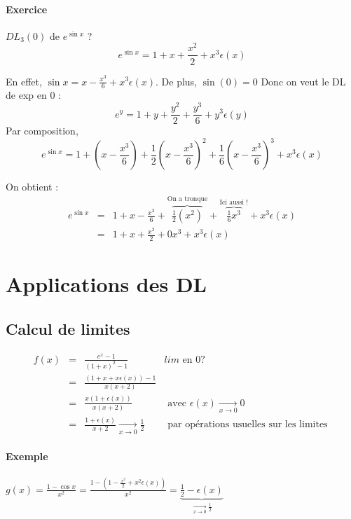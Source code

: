 \paragraph{Exercice} $DL_3(0)$ de $e^{\sin x}$ ? \[e^{\sin x} = 1 + x + \frac{x^2}{2}+x^3\epsilon (x)\]

En effet, $\sin x = x - \frac{x^3}{6}+x^3 \epsilon (x)$. De plus, $\sin(0) = 0$ Donc on veut le DL de exp en 0 : \[
e^y = 1 + y + \frac{y^2}{2}+\frac{y^3}{6} + y^3 \epsilon (y)\]
Par composition, \[e^{\sin x} = 1 + (x-\frac{x^3}{6}) + \frac{1}{2}(x - \frac{x^3}{6})^2 + \frac{1}{6} (x - \frac{x^3}{6})^3 + x^3 \epsilon (x) \]

On obtient : \[\begin{array}{rcl}
e^{\sin x} &=& 1 + x - \frac{x^3}{6} + \overbrace{\frac{1}{2}(x^2)}^{\text{On a tronque}} + \overbrace{\frac{1}{6}x^3}^{\text{Ici aussi !}} + x^3\epsilon (x) \\
&=& 1 +x + \frac{x^2}{2} + 0x^3 + x^3 \epsilon (x)
\end{array}\]

\section{Applications des DL}
\subsection{Calcul de limites}
\[\begin{array}{rclr}
f(x) &=& \frac{e^x-1}{(1+x)^2 - 1} & lim \text{ en } 0 ? \\
&=& \frac{(1+x+x\epsilon(x)) -1}{x(x+2)} \\
&=& \frac{x(1+\epsilon(x))}{x(x+2)} &\text{ avec } \epsilon(x) \xrightarrow[x \to 0]{} 0 \\
&=& \frac{1+\epsilon(x)}{x+2} \xrightarrow[x \to 0]{} \frac{1}{2} & \text{ par opérations usuelles sur les limites } \end{array}\]

\paragraph{Exemple} $g(x) = \frac{1-\cos x}{x^2} = \frac{1-(1 - \frac{x^2}{2} + x^2 \epsilon(x))}{x^2} = \underbrace{\frac{1}{2} - \epsilon (x)}_{\xrightarrow[x \to 0]{} \frac{1}{2}}$


